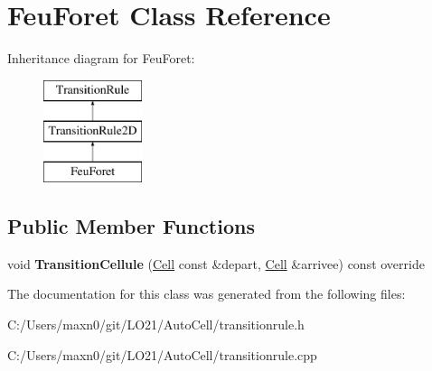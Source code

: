\hypertarget{class_feu_foret}{}\section{Feu\+Foret Class Reference}
\label{class_feu_foret}
Inheritance diagram for Feu\+Foret\+:\begin{figure}[H]
\begin{center}
\leavevmode
\includegraphics[height=3.000000cm]{class_feu_foret}
\end{center}
\end{figure}
\subsection*{Public Member Functions}
\begin{DoxyCompactItemize}
\item 
\mbox{\label{class_feu_foret_a1fb3642690cc586faf0cbc6e9fae64cf}} 
void {\bfseries Transition\+Cellule} (\mbox{\hyperlink{class_cell}{Cell}} const \&depart, \mbox{\hyperlink{class_cell}{Cell}} \&arrivee) const override
\end{DoxyCompactItemize}


The documentation for this class was generated from the following files\+:\begin{DoxyCompactItemize}
\item 
C\+:/\+Users/maxn0/git/\+L\+O21/\+Auto\+Cell/transitionrule.\+h\item 
C\+:/\+Users/maxn0/git/\+L\+O21/\+Auto\+Cell/transitionrule.\+cpp\end{DoxyCompactItemize}
